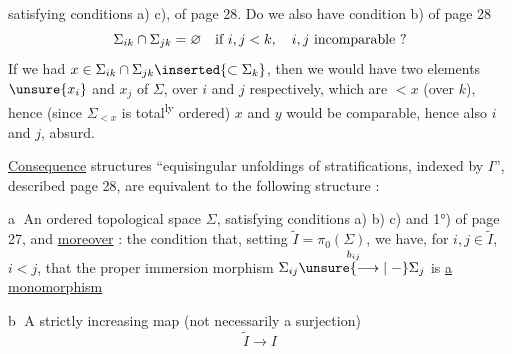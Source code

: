 satisfying conditions a) c),  of page 28.
Do we also have condition b) of page 28
\[
\Sigma_{ik}\cap\Sigma_{jk}=\varnothing\quad\hbox{if }i,j<k,\quad
i,j\ \hbox{incomparable ?}
\]
If we had $x\in\Sigma_{ik}\cap\Sigma_{jk}\inserted{\subset\Sigma_k}$,
then we would have two elements $\unsure{x_i}$ and $x_j$ of $\Sigma$,
over $i$ and $j$ respectively, which are $<x$
(over $k$), hence (since $\Sigma_{<x}$ is total\textsuperscript{ly} ordered)
 $x$ and $y$ would be comparable, hence also
$i$ and $j$, absurd.

\uline{Consequence}  structures ``equisingular
unfoldings of stratifications, indexed by $I$'',
described  page 28, are equivalent to the following structure :


\textcircled{a} An \deleted{$\Sigma$} ordered topological space $\Sigma$,
satisfying  conditions a) b) c) and 1°) of page 27,
and \uline{moreover} : the condition that, 
setting $\widetilde I=\pi_0(\Sigma)$, we have, for
$i,j\in\widetilde I$,
$i<j$, that the proper
 immersion morphism $\Sigma_{ij}\overset{b_{ij}}{\unsure{\longrightarrow|\mathrel{-}}}\Sigma_j$ is
\uline{a monomorphism}

\textcircled{b} A strictly increasing map
(not necessarily a surjection)
\[
\widetilde I\longrightarrow I
\]
